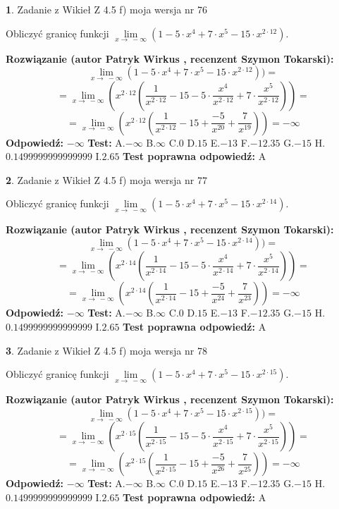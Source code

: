 \documentclass[12pt, a4paper]{article}
\theoremstyle{definition} %
\newtheorem{zad}{}
\newcommand{\zadStart}[1]{\begin{zad}#1\newline}
\newcommand{\zadStop}{\end{zad}}
\newcommand{\rozwStart}[2]{\noindent \textbf{Rozwiązanie (autor #1 , recenzent #2): }\newline}
\newcommand{\rozwStop}{\newline}
\newcommand{\odpStart}{\noindent \textbf{Odpowiedź:}\newline}
\newcommand{\odpStop}{\newline}
\newcommand{\testStart}{\noindent \textbf{Test:}\newline}
\newcommand{\testStop}{\newline}
\newcommand{\kluczStart}{\noindent \textbf{Test poprawna odpowiedź:}\newline}
\newcommand{\kluczStop}{\newline}
\begin{document}
\zadStart{Zadanie z Wikieł Z 4.5 f) moja wersja nr 76}


Obliczyć granicę funkcji  $\lim\limits_{x\to\ -\infty}(1 - 5 \cdot x^{4}+7 \cdot x^{5}- 15 \cdot x^{2\cdot12})$.
\zadStop
\rozwStart{Patryk Wirkus}{Szymon Tokarski}
$$\lim\limits_{x\to\ -\infty}(1 - 5 \cdot x^{4}+7 \cdot x^{5}- 15 \cdot x^{2\cdot12}))=$$
$$=\lim\limits_{x\to\ -\infty}(x^{2\cdot12}(\frac{1}{x^{2\cdot12}}-15 -5 \cdot \frac{x^{4}}{x^{2\cdot12}}+7 \cdot \frac{x^{5}}{x^{2\cdot12}}))=$$
$$=\lim\limits_{x\to\ -\infty}(x^{2\cdot12}(\frac{1}{x^{2\cdot12}}-15 + \frac{-5}{x^{20}}+ \frac{7}{x^{19}}))=-\infty$$
\rozwStop
\odpStart
$-\infty$
\odpStop
\testStart
A.$-\infty$ B.$\infty$ C.$0$ D.$15$ E.$-13$
F.$-12.35$ G.$-15$
H.$0.1499999999999999$
I.$2.65$
\testStop
\kluczStart
A
\kluczStop



\zadStart{Zadanie z Wikieł Z 4.5 f) moja wersja nr 77}


Obliczyć granicę funkcji  $\lim\limits_{x\to\ -\infty}(1 - 5 \cdot x^{4}+7 \cdot x^{5}- 15 \cdot x^{2\cdot14})$.
\zadStop
\rozwStart{Patryk Wirkus}{Szymon Tokarski}
$$\lim\limits_{x\to\ -\infty}(1 - 5 \cdot x^{4}+7 \cdot x^{5}- 15 \cdot x^{2\cdot14}))=$$
$$=\lim\limits_{x\to\ -\infty}(x^{2\cdot14}(\frac{1}{x^{2\cdot14}}-15 -5 \cdot \frac{x^{4}}{x^{2\cdot14}}+7 \cdot \frac{x^{5}}{x^{2\cdot14}}))=$$
$$=\lim\limits_{x\to\ -\infty}(x^{2\cdot14}(\frac{1}{x^{2\cdot14}}-15 + \frac{-5}{x^{24}}+ \frac{7}{x^{23}}))=-\infty$$
\rozwStop
\odpStart
$-\infty$
\odpStop
\testStart
A.$-\infty$ B.$\infty$ C.$0$ D.$15$ E.$-13$
F.$-12.35$ G.$-15$
H.$0.1499999999999999$
I.$2.65$
\testStop
\kluczStart
A
\kluczStop



\zadStart{Zadanie z Wikieł Z 4.5 f) moja wersja nr 78}


Obliczyć granicę funkcji  $\lim\limits_{x\to\ -\infty}(1 - 5 \cdot x^{4}+7 \cdot x^{5}- 15 \cdot x^{2\cdot15})$.
\zadStop
\rozwStart{Patryk Wirkus}{Szymon Tokarski}
$$\lim\limits_{x\to\ -\infty}(1 - 5 \cdot x^{4}+7 \cdot x^{5}- 15 \cdot x^{2\cdot15}))=$$
$$=\lim\limits_{x\to\ -\infty}(x^{2\cdot15}(\frac{1}{x^{2\cdot15}}-15 -5 \cdot \frac{x^{4}}{x^{2\cdot15}}+7 \cdot \frac{x^{5}}{x^{2\cdot15}}))=$$
$$=\lim\limits_{x\to\ -\infty}(x^{2\cdot15}(\frac{1}{x^{2\cdot15}}-15 + \frac{-5}{x^{26}}+ \frac{7}{x^{25}}))=-\infty$$
\rozwStop
\odpStart
$-\infty$
\odpStop
\testStart
A.$-\infty$ B.$\infty$ C.$0$ D.$15$ E.$-13$
F.$-12.35$ G.$-15$
H.$0.1499999999999999$
I.$2.65$
\testStop
\kluczStart
A
\kluczStop
\end{document}
